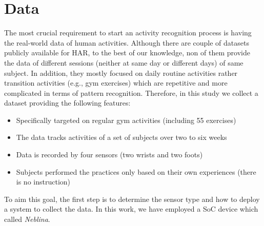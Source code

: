 \documentclass[journal,article,submit,moreauthors,pdftex]{Definitions/mdpi}
\begin{document}
\section{Data}

The most crucial requirement to start an activity recognition process is having the real-world data of human activities. Although there are couple of datasets publicly available for HAR\cite{wang2019survey}, to the best of our knowledge, non of them provide the data of different sessions (neither at same day or different days) of same subject. In addition, they mostly focused on daily routine activities rather transition activities (e.g., gym exercises) which are repetitive and more complicated in terms of pattern recognition\cite{wang2019survey}. Therefore, in this study we collect a dataset providing the following features:
\begin{itemize}[leftmargin=*,labelsep=5.8mm]
	\item Specifically targeted on regular gym activities (including 55 exercises)
	\item The data tracks activities of a set of subjects over two to six weeks
	\item Data is recorded by four sensors (two wrists and two foots)
	\item Subjects performed the practices only based on their own experiences (there is no instruction) 
\end{itemize}
To aim this goal, the first step is to determine the sensor type and how to deploy a system to collect the data. In this work, we have employed a SoC device which called \textit{Neblina}.
\end{document}
